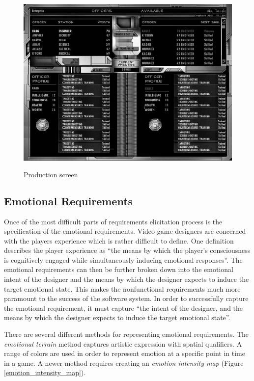 \begin{figure}[!ht]
	\includegraphics[scale=0.5]{Images/final}
	\label{final}
	\caption{Production screen \cite{bethke2003game}}
\end{figure}

\subsection{Emotional Requirements}

Once of the most difficult parts of requirements elicitation process is the specification of the emotional requirements. Video game designers are concerned with the players experience which is rather difficult to define. One definition describes the player experience as ``the means by which the player's consciousness is cognitively engaged while simultaneously inducing emotional responses''\cite{callele2006emotional}. The emotional requirements can then be further broken down into the emotional intent of the designer and the means by which the designer expects to induce the target emotional state\cite{callele2006emotional}. This makes the nonfunctional requirements much more paramount to the success of the software system. In order to successfully capture the emotional requirement, it must capture ``the intent of the designer, and the means by which the designer expects to induce the target emotional state''\cite{callele2006emotional}.

There are several different methods for representing emotional requirements. The \emph{emotional terrain} method captures artistic expression with spatial qualifiers. A range of colors are used in order to represent emotion at a specific point in time in a game. A newer method requires creating an \emph{emotion intensity map} (Figure \ref{emotion_intensity_map}).

